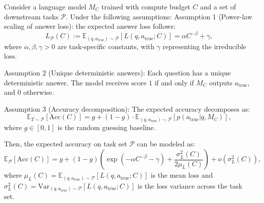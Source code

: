 \begin{theorem}
\label{main:proof:task_scaling_law}
Consider a language model $M_C$ trained with compute budget $C$ and a set of downstream tasks $\mathcal{P}$. Under the following assumptions:
Assumption 1 (Power-law scaling of answer loss): the expected answer loss follows:
\begin{equation}
L_{\mathcal{P}}(C) := \mathbb{E}_{(q,a_{\text{true}}) \sim \mathcal{P}}[L(q, a_{\text{true}}; C)] = \alpha C^{-\beta} + \gamma,
\end{equation}
where $\alpha, \beta, \gamma > 0$ are task-specific constants, with $\gamma$ representing the irreducible loss.

Assumption 2 (Unique deterministic answers): Each question has a unique deterministic answer. The model receives score $1$ if and only if $M_C$ outputs $a_{\text{true}}$, and $0$ otherwise.

Assumption 3 (Accuracy decomposition): The expected accuracy decomposes as:
\begin{equation}
\mathbb{E}_{T \sim \mathcal{P}}[\mathrm{Acc}(C)] = g + (1-g) \cdot \mathbb{E}_{(q,a_{\text{true}}) \sim \mathcal{P}}[p(a_{\text{true}}|q, M_C)],
\end{equation}
where $g \in [0,1]$ is the random guessing baseline.

Then, the expected accuracy on task set $\mathcal{P}$ can be modeled as:
\begin{equation}
\mathbb{E}_{\mathcal{P}}[\mathrm{Acc}(C)] =g+(1-g)\left(\exp{(-\alpha C^{-\beta}-\gamma)} + \frac{\sigma_L^2(C)}{2\mu_L(C)} \right)+ o\left(\sigma_L^2(C)\right), 
\end{equation}
where $\mu_L(C) = \mathbb{E}_{(q,a_{\text{true}}) \sim \mathcal{P}}[L(q, a_{\text{true}}; C)]$ is the mean loss and $\sigma_L^2(C) = \mathrm{Var}_{(q,a_{\text{true}}) \sim \mathcal{P}}[L(q, a_{\text{true}}; C)]$ is the loss variance across the task set.
\end{theorem}


